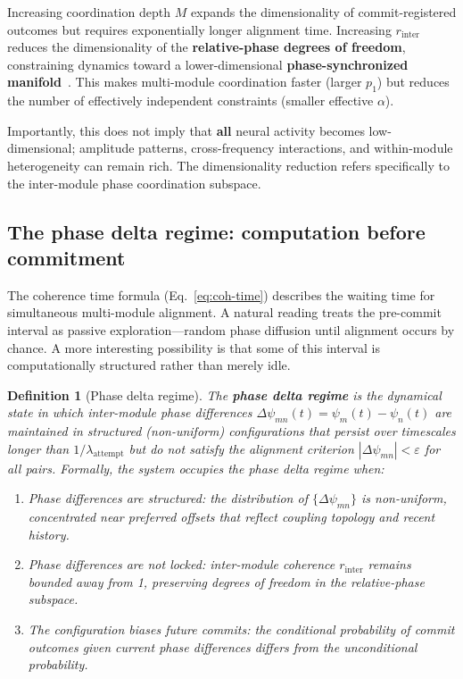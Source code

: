 \documentclass[12pt]{article}
\newtheorem{definition}{Definition}
\begin{document}
Increasing coordination depth $M$ expands the dimensionality of commit-registered outcomes but requires exponentially longer alignment time. Increasing $r_{\mathrm{inter}}$ reduces the dimensionality of the \textbf{relative-phase degrees of freedom}, constraining dynamics toward a lower-dimensional \textbf{phase-synchronized manifold}~\cite{strogatz2000,ott2008}. This makes multi-module coordination faster (larger $p_1$) but reduces the number of effectively independent constraints (smaller effective $\alpha$).

Importantly, this does not imply that \textbf{all} neural activity becomes low-dimensional; amplitude patterns, cross-frequency interactions, and within-module heterogeneity can remain rich. The dimensionality reduction refers specifically to the inter-module phase coordination subspace.

\subsection{The phase delta regime: computation before commitment}

The coherence time formula (Eq.~\ref{eq:coh-time}) describes the waiting time for simultaneous multi-module alignment. A natural reading treats the pre-commit interval as passive exploration---random phase diffusion until alignment occurs by chance. A more interesting possibility is that some of this interval is computationally structured rather than merely idle.

\begin{definition}[Phase delta regime]\label{def:phase-delta}
The \textbf{phase delta regime} is the dynamical state in which inter-module phase differences $\Delta\psi_{mn}(t) = \psi_m(t) - \psi_n(t)$ are maintained in structured (non-uniform) configurations that persist over timescales longer than $1/\lambda_{\mathrm{attempt}}$ but do not satisfy the alignment criterion $|\Delta\psi_{mn}| < \varepsilon$ for all pairs. Formally, the system occupies the phase delta regime when:
\begin{enumerate}
\item Phase differences are \emph{structured}: the distribution of $\{\Delta\psi_{mn}\}$ is non-uniform, concentrated near preferred offsets that reflect coupling topology and recent history.
\item Phase differences are \emph{not locked}: inter-module coherence $r_{\mathrm{inter}}$ remains bounded away from 1, preserving degrees of freedom in the relative-phase subspace.
\item The configuration \emph{biases future commits}: the conditional probability of commit outcomes given current phase differences differs from the unconditional probability.
\end{enumerate}
\end{definition}
\end{document}
